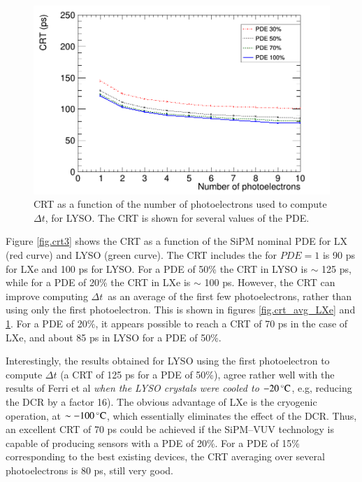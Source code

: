 \documentclass[review]{elsarticle}
\begin{document}
 \begin{figure}[!bhtp]
	\centering
	\includegraphics[scale=0.30]{../img/PetaloTOF/lyso_noCher_avg_npe_phys.png}
	\caption{\label{fig.crt_avg_LYSO} CRT as a function of the number of photoelectrons used to compute $\Delta t$, for LYSO. The CRT is shown for several values of the PDE.}
\end{figure}

Figure \ref{fig.crt3} shows the CRT as a function of the
 SiPM nominal PDE for LX (red curve) and LYSO (green curve). The CRT includes the
for $PDE=1$ is 90 ps for LXe and 100 ps for LYSO.  For a PDE of 50\% the CRT in LYSO is $\sim$ 125 ps, while for a PDE of 20\%  the CRT in LXe is $\sim$ 100 ps. However, the CRT can improve computing $\Delta t$~as an average of the first few photoelectrons, rather than using only the first photoelectron. This is shown in figures
\ref{fig.crt_avg_LXe} and \ref{fig.crt_avg_LYSO}. For a PDE of 20\%, it appears possible to reach a
CRT of 70 ps in the case of LXe, and about 85 ps in LYSO for a PDE of 50\%.

Interestingly, the results obtained for LYSO using the first photoelectron to compute $\Delta t$ (a CRT of 125 ps for a PDE of 50\%), agree rather well with the results of Ferri et al  \cite{LysoFBK} {\em when the LYSO crystals were cooled 
to $-20\,^{\circ}{\rm C}$}, e.g, reducing the DCR by a factor 16). The obvious advantage of LXe is the cryogenic operation, at $\sim -100\,^{\circ}{\rm C}$, which essentially eliminates the effect of the DCR. Thus, an excellent CRT of 70 ps could be achieved if the SiPM--VUV technology is capable of producing sensors with a PDE of 20\%. For a PDE of 15\% corresponding to the best existing devices, the CRT averaging over several photoelectrons is 80 ps, still very good.
\end{document}
